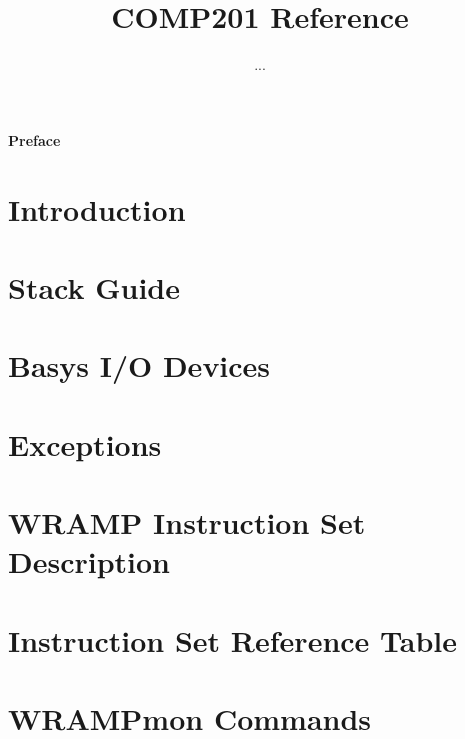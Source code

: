 \documentclass[a4paper]{book}
\title{COMP201 Reference}
\author{...}
\begin{document}

\begin{Huge}
\vspace{2cm}
\textbf{Preface}\\
\vspace{1.5cm}
\end{Huge}



\tableofcontents

\chapter{Introduction}
\label{chapter:intro}

\chapter{Stack Guide}
\label{chapter:stack}

\chapter{Basys I/O Devices}
\label{chapter:io}

\chapter{Exceptions}
\label{chapter:exceptions}

\appendix
\chapter{WRAMP Instruction Set Description}
\label{appendix:instr}

\chapter{Instruction Set Reference Table}
\label{appendix:instrsm}
\addtolength{\hoffset}{-1cm}
\addtolength{\textwidth}{1cm}

\chapter{WRAMPmon Commands}
\label{appendix:wrampmon}

\end{document}
